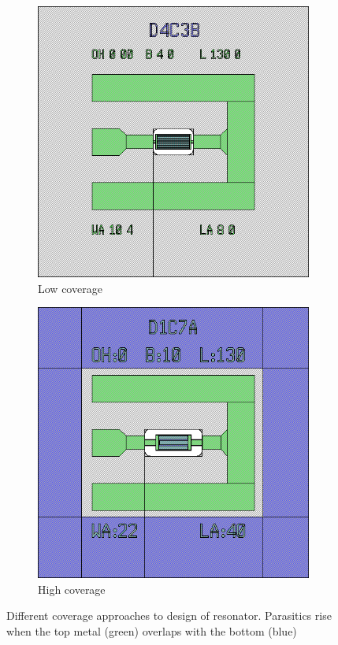 \begin{figure}
	\begin{subfigure}{.5\textwidth}
		\centering
		\includegraphics[width=0.8\linewidth]{images/Coverage/low}
		\caption{Low coverage}
		\label{subfig:low}
	\end{subfigure}
	\begin{subfigure}{.5\textwidth}
		\centering
		\includegraphics[width=0.8\linewidth]{images/Coverage/high}
		\caption{High coverage}
		\label{subfig:high}
	\end{subfigure}
	\caption{Different coverage approaches to design of resonator. Parasitics rise when the top metal (green) overlaps with the bottom (blue)}
\end{figure}

